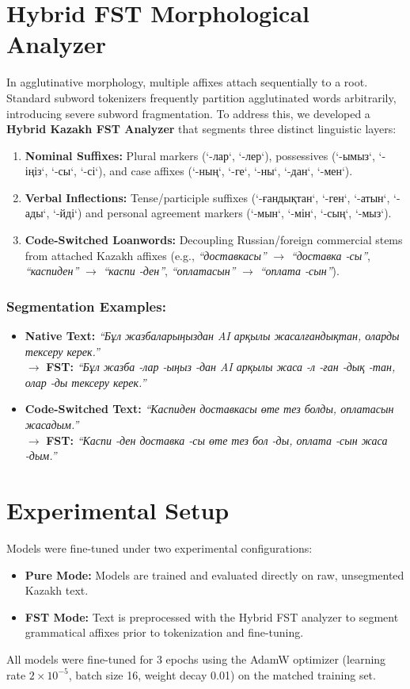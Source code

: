 \documentclass[runningheads]{llncs}
\begin{document}
\section{Hybrid FST Morphological Analyzer}
In agglutinative morphology, multiple affixes attach sequentially to a root. Standard subword tokenizers frequently partition agglutinated words arbitrarily, introducing severe subword fragmentation. To address this, we developed a \textbf{Hybrid Kazakh FST Analyzer} that segments three distinct linguistic layers:
\begin{enumerate}
\item \textbf{Nominal Suffixes:} Plural markers (`-лар`, `-лер`), possessives (`-ымыз`, `-іңіз`, `-сы`, `-сі`), and case affixes (`-ның`, `-ге`, `-ны`, `-дан`, `-мен`).
\item \textbf{Verbal Inflections:} Tense/participle suffixes (`-ғандықтан`, `-ген`, `-атын`, `-ады`, `-йді`) and personal agreement markers (`-мын`, `-мін`, `-сың`, `-мыз`).
\item \textbf{Code-Switched Loanwords:} Decoupling Russian/foreign commercial stems from attached Kazakh affixes (e.g., \textit{``доставкасы''} $\rightarrow$ \textit{``доставка -сы''}, \textit{``каспиден''} $\rightarrow$ \textit{``каспи -ден''}, \textit{``оплатасын''} $\rightarrow$ \textit{``оплата -сын''}).
\end{enumerate}

\subsubsection{Segmentation Examples:}
\begin{itemize}
\item \textbf{Native Text:} \textit{``Бұл жазбаларыңыздан AI арқылы жасалғандықтан, оларды тексеру керек.''} \\
$\rightarrow$ \textbf{FST:} \textit{``Бұл жазба -лар -ыңыз -дан AI арқылы жаса -л -ған -дық -тан, олар -ды тексеру керек.''}
\item \textbf{Code-Switched Text:} \textit{``Каспиден доставкасы өте тез болды, оплатасын жасадым.''} \\
$\rightarrow$ \textbf{FST:} \textit{``Каспи -ден доставка -сы өте тез бол -ды, оплата -сын жаса -дым.''}
\end{itemize}

\section{Experimental Setup}
Models were fine-tuned under two experimental configurations:
\begin{itemize}
\item \textbf{Pure Mode:} Models are trained and evaluated directly on raw, unsegmented Kazakh text.
\item \textbf{FST Mode:} Text is preprocessed with the Hybrid FST analyzer to segment grammatical affixes prior to tokenization and fine-tuning.
\end{itemize}
All models were fine-tuned for 3 epochs using the AdamW optimizer (learning rate $2 \times 10^{-5}$, batch size 16, weight decay 0.01) on the matched training set.
\end{document}
